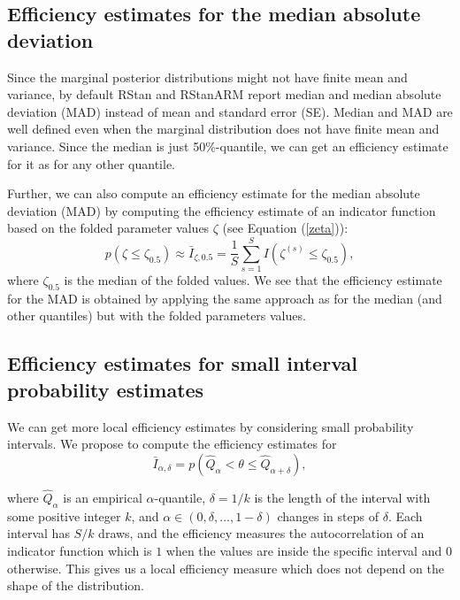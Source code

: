 \documentclass[american,]{article}
\begin{document}
\hypertarget{efficiency-estimates-for-the-median-absolute-deviation}{%
\subsection{Efficiency estimates for the median absolute
deviation}\label{efficiency-estimates-for-the-median-absolute-deviation}}

Since the marginal posterior distributions might not have finite mean
and variance, by default RStan \citep{RStan.2.17} and RStanARM
\citep{RStanARM.2.17} report median and median absolute deviation (MAD)
instead of mean and standard error (SE). Median and MAD are well defined
even when the marginal distribution does not have finite mean and
variance. Since the median is just 50\%-quantile, we can get an
efficiency estimate for it as for any other quantile.

Further, we can also compute an efficiency estimate for the median
absolute deviation (MAD) by computing the efficiency estimate of an
indicator function based on the folded parameter values \(\zeta\) (see
Equation (\ref{zeta})):
\begin{equation}
p(\zeta \leq \zeta_{0.5}) \approx \bar{I}_{\zeta,0.5} = \frac{1}{S}\sum_{s=1}^S
I(\zeta^{(s)} \leq \zeta_{0.5}),
\end{equation}
where \(\zeta_{0.5}\) is the median of the folded values. We see that
the efficiency estimate for the MAD is obtained by applying the same
approach as for the median (and other quantiles) but with the folded
parameters values.

\hypertarget{small_interval_S_eff}{%
\subsection{Efficiency estimates for small interval probability
estimates}\label{small_interval_S_eff}}

We can get more local efficiency estimates by considering small
probability intervals. We propose to compute the efficiency estimates
for
\begin{equation}
\bar{I}_{\alpha,\delta} = p(\hat{Q}_\alpha < \theta \leq \hat{Q}_{\alpha+\delta}),
\end{equation}

where \(\hat{Q}_\alpha\) is an empirical \(\alpha\)-quantile,
\(\delta=1/k\) is the length of the interval with some positive integer
\(k\), and \(\alpha \in (0,\delta,\ldots,1-\delta)\) changes in steps of
\(\delta\). Each interval has \(S/k\) draws, and the efficiency measures
the autocorrelation of an indicator function which is \(1\) when the
values are inside the specific interval and \(0\) otherwise. This gives
us a local efficiency measure which does not depend on the shape of the
distribution.
\end{document}
